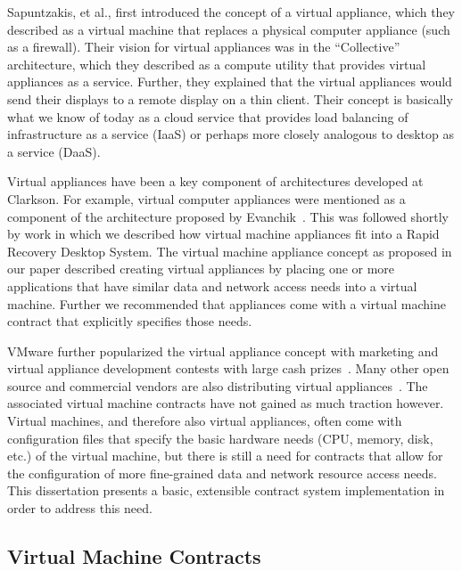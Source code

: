 Sapuntzakis, et al., first introduced the concept of a virtual appliance\cite{sapuntzakis_2003}, which they described as a virtual machine that replaces a physical computer appliance (such as a firewall). Their vision for virtual appliances was in the ``Collective'' architecture, which they described as a compute utility that provides virtual appliances as a service. Further, they explained that the virtual appliances would send their displays to a remote display on a thin client. Their concept is basically what we know of today as a cloud service that provides load balancing of infrastructure as a service (IaaS) or perhaps more closely analogous to desktop as a service (DaaS).

Virtual appliances have been a key component of architectures developed at Clarkson. For example, virtual computer appliances were mentioned as a component of the architecture proposed by Evanchik~\cite{evanchik_thesis_2004}. This was followed shortly by work in which we described how virtual machine appliances fit into a Rapid Recovery Desktop System\cite{rapid_recovery_paper_05}. The virtual machine appliance concept as proposed in our paper described creating virtual appliances by placing one or more applications that have similar data and network access needs into a virtual machine. Further we recommended that appliances come with a virtual machine contract that explicitly specifies those needs.

VMware further popularized the virtual appliance concept with marketing and virtual appliance development contests with large cash prizes~\cite{herrod_keynote_2006,vmware_appliances_website}. Many other open source and commercial vendors are also distributing virtual appliances~\cite{rPath_website, stacklet_website, virtual_appliances_website, jumpbox_website}. The associated virtual machine contracts have not gained as much traction however. Virtual machines, and therefore also virtual appliances, often come with configuration files that specify the basic hardware needs (CPU, memory, disk, etc.) of the virtual machine, but there is still a need for contracts that allow for the configuration of more fine-grained data and network resource access needs. This dissertation presents a basic, extensible contract system implementation in order to address this need.

\subsection{Virtual Machine Contracts}
\label{sec:VirtualMachineContracts}


